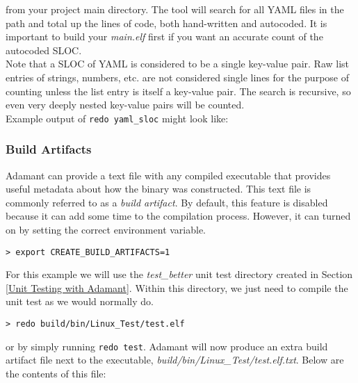 from your project main directory. The tool will search for all YAML files in the path and total up the lines of code, both hand-written and autocoded. It is important to build your \textit{main.elf} first if you want an accurate count of the autocoded SLOC.\\

Note that a SLOC of YAML is considered to be a single key-value pair. Raw list entries of strings, numbers, etc. are not considered single lines for the purpose of counting unless the list entry is itself a key-value pair. The search is recursive, so even very deeply nested key-value pairs will be counted. \\

Example output of \texttt{redo yaml\_sloc} might look like:


\subsubsection{Build Artifacts}

Adamant can provide a text file with any compiled executable that provides useful metadata about how the binary was constructed. This text file is commonly referred to as a \textit{build artifact}. By default, this feature is disabled because it can add some time to the compilation process. However, it can turned on by setting the correct environment variable.

\vspace{5mm} %
\begin{verbatim}
> export CREATE_BUILD_ARTIFACTS=1
\end{verbatim}
\vspace{5mm} %

For this example we will use the \textit{test\_better} unit test directory created in Section \ref{Unit Testing with Adamant}. Within this directory, we just need to compile the unit test as we would normally do.

\vspace{5mm} %
\begin{verbatim}
> redo build/bin/Linux_Test/test.elf
\end{verbatim}
\vspace{5mm} %

or by simply running \texttt{redo test}. Adamant will now produce an extra build artifact file next to the executable, \textit{build/bin/Linux\_Test/test.elf.txt}. Below are the contents of this file: \\

